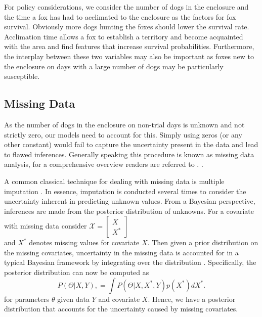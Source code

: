 \documentclass[aoas,preprint]{imsart}
\numberwithin{equation}{section}
\theoremstyle{plain}
\begin{document}
For policy considerations, we consider the number of dogs in the enclosure and the time a fox has had to acclimated to the enclosure as the factors for fox survival. Obviously more dogs hunting the foxes should lower the survival rate. Acclimation time allows a fox to establish a territory and become acquainted with the area and find features that increase survival probabilities. Furthermore, the interplay between these two variables may also be important as foxes new to the enclosure on days with a large number of dogs may be particularly susceptible. 

\subsection{Missing Data}
As the number of dogs in the enclosure on non-trial days is unknown and not strictly zero, our models need to account for this. Simply using zeros (or any other constant) would fail to capture the uncertainty present in the data and lead to flawed inferences. Generally speaking this procedure is known as missing data analysis, for a comprehensive overview readers are referred to \citep{little}.  .

A common classical technique for dealing with missing data is multiple imputation \citep{rubin1976,rubin}. In essence, imputation is conducted several times to consider the uncertainty inherent in predicting unknown values.
From a Bayesian perspective, inferences are made from the posterior distribution of unknowns. For a covariate with missing data consider $
	\mathcal{X}=\left[
	\begin{array}{ll}
	X \\
	X^{*} 
	\end{array}
	\right]$ \\ 
	and $X^{*}$ denotes missing values for covariate $X$. Then given a prior distribution on the missing covariates, uncertainty in the missing data is accounted for in a typical Bayesian framework by integrating over the distribution \citep{boone2009}. Specifically, the posterior distribution can now be computed as $$P(\Theta|X,Y), = \int P(\Theta|X,X^{*},Y) p(X^{*}) dX^{*}.$$
	for parameters $\theta$ given data $Y$ and covariate $X$. Hence, we have a posterior distribution that accounts for the uncertainty caused by missing covariates.
\end{document}
